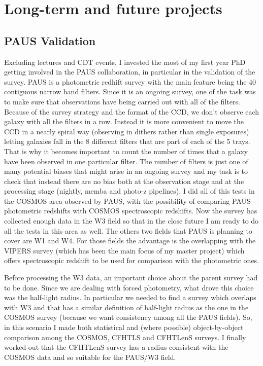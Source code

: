 \documentclass[letterpaper]{article}
\begin{document}
\section{Long-term and future projects}
\label{sec:long}

\subsection{PAUS Validation} 
\label{sub:PAU_val}
Excluding lectures and CDT events, I invested the most of my first year PhD getting involved in the PAUS collaboration, in particular in the validation of the survey. PAUS is a photometric redhift survey with the main feature being the 40 contiguous narrow band filters. Since it is an ongoing survey, one of the task was to make sure that observations have being carried out with all of the filters. Because of the survey strategy and the format of the CCD, we don't observe each galaxy with all the filters in a row. Instead it is more convenient to move the CCD in a nearly spiral way (observing in dithers rather than single exposures) letting galaxies fall in the 8 different filters that are part of each of the 5 trays. That is why it becomes important to count the number of times that a galaxy have been observed in one particular filter. The number of filters is just one of many potential biases that might arise in an ongoing survey and my task is to check that instead there are no bias both at the observation stage and at the processing stage  (nightly, memba and photo-z pipelines). I did all of this tests in the COSMOS area observed by PAUS, with the possibility of comparing PAUS photometric redshifts with COSMOS spectroscopic redshifts. Now the survey has collected enough data in the W3 field so that in the close future I am ready to do all the tests in this area as well. The others two fields that PAUS is planning to cover are W1 and W4. For those fields the advantage is the overlapping with the VIPERS survey (which has been the main focus of my master project) which offers spectroscopic redshift to be used for comparison with the photometric ones. 

Before processing the W3 data, an important choice about the parent survey had to be done. Since we are dealing with forced photometry, what drove this choice was the half-light radius. In particular we needed to find a survey which overlaps with W3 and that has a similar definition of half-light radius as the one in the COSMOS survey (because we want consistency among all the PAUS fields). So, in this scenario I made both statistical and (where possible) object-by-object comparison among the COSMOS, CFHTLS and CFHTLenS surveys. I finally worked out that the CFHTLenS survey has a radius consistent with the COSMOS data and so suitable for the PAUS/W3 field.
\end{document}
